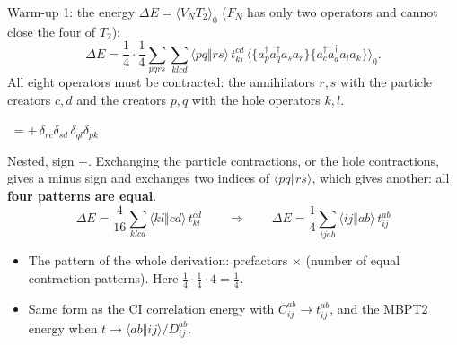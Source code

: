 \documentclass[aspectratio=169,10pt]{beamer}
\newcommand{\av}[1]{\langle #1\rangle_0}
\newcommand{\cre}[1]{a_{#1}^{\dagger}}
\newcommand{\ann}[1]{a_{#1}}
\newcommand{\no}[1]{\bigl\{#1\bigr\}}
\newcommand{\as}[4]{\langle #1#2\Vert #3#4\rangle}
\begin{document}
\begin{frame}[shrink=16]{Warm-up 1: the energy}
\small
$\Delta E=\av{V_NT_2}$ ($F_N$ has only two operators and cannot close the four of $T_2$):
\[
 \Delta E=\frac14\cdot\frac14\sum_{pqrs}\sum_{klcd}\as pqrs\,t_{kl}^{cd}\,
 \av{\no{\cre p\cre q\ann s\ann r}\no{\cre c\cre d\ann l\ann k}} .
\]
All eight operators must be contracted: the annihilators $r,s$ with the particle creators $c,d$ and the creators $p,q$ with the hole operators $k,l$.
\begin{center}
$\;=+\,\delta_{rc}\delta_{sd}\,\delta_{ql}\delta_{pk}$
\end{center}
Nested, sign $+$. Exchanging the particle contractions, or the hole contractions, gives a minus sign and exchanges two indices of $\as pqrs$, which gives another: all \textbf{four patterns are equal}.
\[
 \Delta E=\frac{4}{16}\sum_{klcd}\as klcd\,t_{kl}^{cd}
 \qquad\Longrightarrow\qquad
 \boxed{\Delta E=\frac14\sum_{ijab}\as ijab\,t_{ij}^{ab}}
\]
\begin{itemize}
\item The pattern of the whole derivation: prefactors $\times$ (number of equal contraction patterns). Here $\tfrac14\cdot\tfrac14\cdot4=\tfrac14$.
\item Same form as the CI correlation energy with $C_{ij}^{ab}\to t_{ij}^{ab}$, and the MBPT2 energy when $t\to\as abij/D_{ij}^{ab}$.
\end{itemize}
\end{frame}
\end{document}
